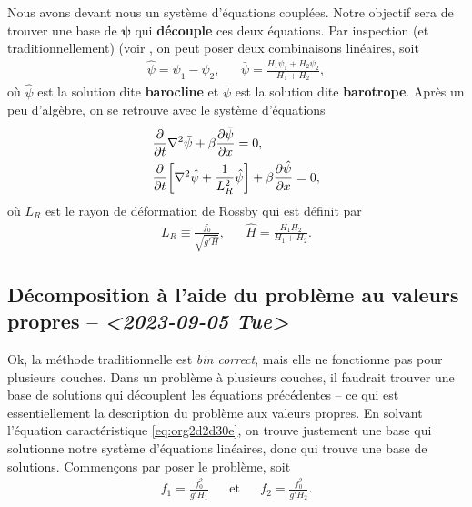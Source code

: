\documentclass[10pt]{article}
\numberwithin{equation}{section}
\begin{document}
Nous avons devant nous un système d'équations couplées.
Notre objectif sera de trouver une base de \(\boldsymbol{\psi}\) qui \textbf{découple} ces deux équations.
Par inspection (et traditionnellement) (voir \autocite[p.230]{vallis_2006}, on peut poser deux combinaisons linéaires, soit
\begin{align}
   &&\hat{\psi} = \psi_1 - \psi_2 ,&& \bar{\psi} = \frac{H_1\psi_1 + H_2\psi_2}{H_1+H_2}, &&
\end{align}
où \(\hat{\psi}\) est la solution dite \textbf{barocline} et \(\bar{\psi}\) est la solution dite \textbf{barotrope}.
Après un peu d'algèbre, on se retrouve avec le système d'équations
\begin{subequations}
\begin{align}
   &\pdv{}{t} \laplacian\bar{\psi} + \beta \pdv{\bar{\psi}}{x} = 0,\\
   &\pdv{}{t} \qty[\laplacian\hat{\psi} + \frac{1}{L_R^2}\hat{\psi}] + \beta \pdv{\hat{\psi}}{x} = 0,
\end{align}
\end{subequations}
où \(L_R\) est le rayon de déformation de Rossby qui est définit par
\begin{align}
   && L_R \equiv \frac{f_0}{\sqrt{g'\hat{H}}}, && \hat{H} = \frac{H_1H_2}{H_1+H_2}.&&
\end{align}
\subsection{Décomposition à l'aide du problème au valeurs propres -- \textit{<2023-09-05 Tue>}}
\label{sec:org21c58b5}

Ok, la méthode traditionnelle est \emph{bin correct}, mais elle ne fonctionne pas pour plusieurs couches.
Dans un problème à plusieurs couches, il faudrait trouver une base de solutions qui découplent les équations précédentes -- ce qui est essentiellement la description du problème aux valeurs propres.
En solvant l'équation caractéristique \ref{eq:org2d2d30e}, on trouve justement une base qui solutionne notre système d'équations linéaires, donc qui trouve une base de solutions.
Commençons par poser le problème, soit
\begin{align}
   && f_1 = \frac{f_0^2}{g'H_1} && \text{et} && f_2 = \frac{f_0^2}{g'H_2}. &&
\end{align}
\end{document}
